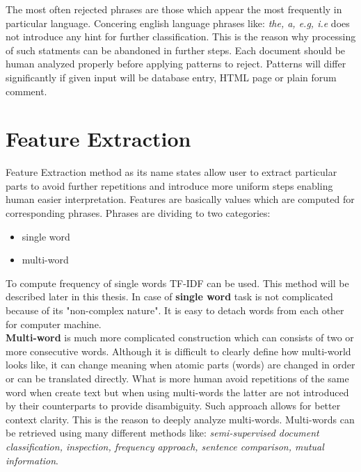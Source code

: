 The most often rejected phrases are those which appear the most frequently in particular language. Concering english language phrases like: \textit{the, a, e.g, i.e} does not introduce any hint for further classification. This is the reason why processing of such statments can be abandoned in further steps. Each document should be human analyzed properly before applying patterns to reject. Patterns will differ significantly if given input will be database entry, HTML page or plain forum comment.

\section{Feature Extraction}

Feature Extraction method as its name states allow user to extract particular parts to avoid further repetitions and introduce more uniform steps enabling human easier interpretation. Features are basically values which are computed for corresponding phrases. Phrases are dividing to two categories:
\begin{itemize}
	\item single word
	\item multi-word
\end{itemize}
To compute frequency of single words TF-IDF can be used. This method will be described later in this thesis. In case of \textbf{single word} task is not complicated because of its "non-complex nature". It is easy to detach words from each other for computer machine.
\\ \newline\textbf{Multi-word} is much more complicated construction which can consists of two or more consecutive words. Although it is difficult to clearly define how multi-world looks like, it can change meaning when atomic parts (words) are changed in order or can be translated directly. What is more human avoid repetitions of the same word when create text but when using multi-words the latter are not introduced by their counterparts to provide disambiguity. Such approach allows for better context clarity. This is the reason to deeply analyze multi-words. Multi-words can be retrieved using many different methods like: \textit{semi-supervised document classification, inspection, frequency approach, sentence comparison, mutual information}.

